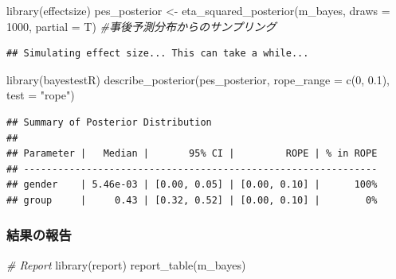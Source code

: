 \documentclass[
  ja=standard, xelatex, base=12pt]{bxjsreport}
\newenvironment{Shaded}{\begin{snugshade}}{\end{snugshade}}
\newcommand{\AttributeTok}[1]{\textcolor[rgb]{0.77,0.63,0.00}{#1}}
\newcommand{\CommentTok}[1]{\textcolor[rgb]{0.56,0.35,0.01}{\textit{#1}}}
\newcommand{\DecValTok}[1]{\textcolor[rgb]{0.00,0.00,0.81}{#1}}
\newcommand{\FloatTok}[1]{\textcolor[rgb]{0.00,0.00,0.81}{#1}}
\newcommand{\FunctionTok}[1]{\textcolor[rgb]{0.00,0.00,0.00}{#1}}
\newcommand{\NormalTok}[1]{#1}
\newcommand{\OtherTok}[1]{\textcolor[rgb]{0.56,0.35,0.01}{#1}}
\newcommand{\StringTok}[1]{\textcolor[rgb]{0.31,0.60,0.02}{#1}}
\begin{document}
\begin{Shaded}
\begin{Highlighting}[]
\FunctionTok{library}\NormalTok{(effectsize)}
\NormalTok{pes\_posterior }\OtherTok{\textless{}{-}} \FunctionTok{eta\_squared\_posterior}\NormalTok{(m\_bayes,}
                                       \AttributeTok{draws =} \DecValTok{1000}\NormalTok{, }
                                       \AttributeTok{partial =}\NormalTok{ T) }\CommentTok{\#事後予測分布からのサンプリング}
\end{Highlighting}
\end{Shaded}

\begin{verbatim}
## Simulating effect size... This can take a while...
\end{verbatim}

\begin{Shaded}
\begin{Highlighting}[]
\FunctionTok{library}\NormalTok{(bayestestR)}
\FunctionTok{describe\_posterior}\NormalTok{(pes\_posterior, }\AttributeTok{rope\_range =} \FunctionTok{c}\NormalTok{(}\DecValTok{0}\NormalTok{, }\FloatTok{0.1}\NormalTok{), }\AttributeTok{test =} \StringTok{"rope"}\NormalTok{)}
\end{Highlighting}
\end{Shaded}

\begin{verbatim}
## Summary of Posterior Distribution
## 
## Parameter |   Median |       95% CI |         ROPE | % in ROPE
## --------------------------------------------------------------
## gender    | 5.46e-03 | [0.00, 0.05] | [0.00, 0.10] |      100%
## group     |     0.43 | [0.32, 0.52] | [0.00, 0.10] |        0%
\end{verbatim}

\hypertarget{ux7d50ux679cux306eux5831ux544a-6}{%
\subsubsection{結果の報告}\label{ux7d50ux679cux306eux5831ux544a-6}}

\begin{Shaded}
\begin{Highlighting}[]
\CommentTok{\# Report}
\FunctionTok{library}\NormalTok{(report)}
\FunctionTok{report\_table}\NormalTok{(m\_bayes)}
\end{Highlighting}
\end{Shaded}
\end{document}
